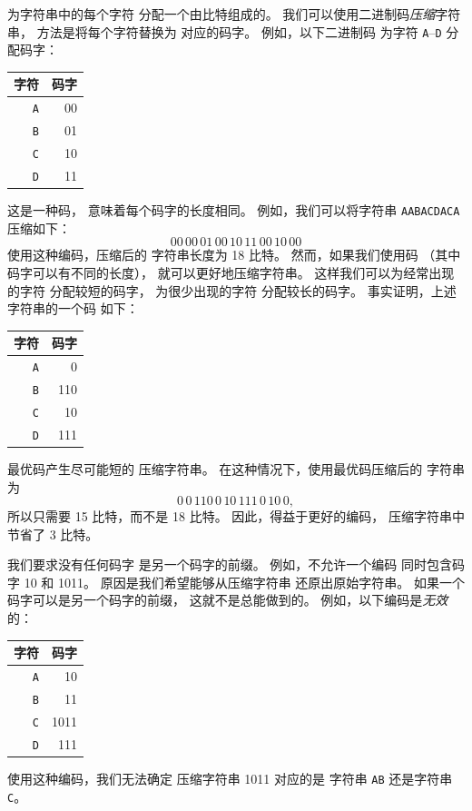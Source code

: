 为字符串中的每个字符
分配一个由比特组成的。
我们可以使用二进制码\emph{压缩}字符串，
方法是将每个字符替换为
对应的码字。
例如，以下二进制码
为字符 \texttt{A}–\texttt{D} 分配码字：
\begin{center}
\begin{tabular}{rr}
字符 & 码字 \\
\hline
\texttt{A} & 00 \\
\texttt{B} & 01 \\
\texttt{C} & 10 \\
\texttt{D} & 11 \\
\end{tabular}
\end{center}
这是一种码，
意味着每个码字的长度相同。
例如，我们可以将字符串
\texttt{AABACDACA} 压缩如下：
\[00\,00\,01\,00\,10\,11\,00\,10\,00\]
使用这种编码，压缩后的
字符串长度为 18 比特。
然而，如果我们使用码
（其中码字可以有不同的长度），
就可以更好地压缩字符串。
这样我们可以为经常出现的字符
分配较短的码字，
为很少出现的字符
分配较长的码字。
事实证明，上述字符串的一个码
如下：
\begin{center}
\begin{tabular}{rr}
字符 & 码字 \\
\hline
\texttt{A} & 0 \\
\texttt{B} & 110 \\
\texttt{C} & 10 \\
\texttt{D} & 111 \\
\end{tabular}
\end{center}
最优码产生尽可能短的
压缩字符串。
在这种情况下，使用最优码压缩后的
字符串为
\[0\,0\,110\,0\,10\,111\,0\,10\,0,\]
所以只需要 15 比特，而不是 18 比特。
因此，得益于更好的编码，
压缩字符串中节省了 3 比特。

我们要求没有任何码字
是另一个码字的前缀。
例如，不允许一个编码
同时包含码字 10
和 1011。
原因是我们希望能够从压缩字符串
还原出原始字符串。
如果一个码字可以是另一个码字的前缀，
这就不是总能做到的。
例如，以下编码是\emph{无效}的：
\begin{center}
\begin{tabular}{rr}
字符 & 码字 \\
\hline
\texttt{A} & 10 \\
\texttt{B} & 11 \\
\texttt{C} & 1011 \\
\texttt{D} & 111 \\
\end{tabular}
\end{center}
使用这种编码，我们无法确定
压缩字符串 1011 对应的是
字符串 \texttt{AB} 还是字符串 \texttt{C}。

